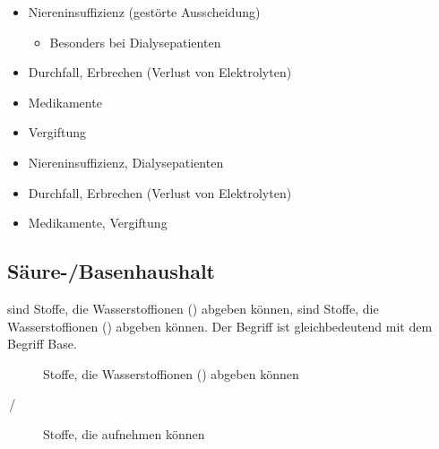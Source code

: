 {%
\label{topic:elektrolytstoerungen}
\label{topic:dialyse-elektrolyte}
%
\begin{itemize}
    \item Niereninsuffizienz (gestörte Ausscheidung)
    \begin{itemize}
        \item Besonders bei Dialysepatienten
    \end{itemize}
    \item Durchfall, Erbrechen (Verlust von Elektrolyten)
    \item Medikamente
    \item Vergiftung
\end{itemize}
}{%
\begin{itemize}
    \item Niereninsuffizienz, Dialysepatienten
    \item Durchfall, Erbrechen (Verlust von Elektrolyten)
    \item Medikamente, Vergiftung
\end{itemize}
}{}{}{}




\subsection{Säure-/Basenhaushalt}
\label{topic:saeure-basen-haushalt}

{%
 sind Stoffe, die 
Wasserstoffionen () abgeben können,  sind 
Stoffe, die Wasserstoffionen () abgeben können. Der Begriff
 ist gleichbedeutend mit dem Begriff Base. 
}{%
\begin{description}
  \item[] Stoffe, die
  Wasserstoffionen () abgeben können
  \item[\,/\,] Stoffe, die  aufnehmen können
\end{description}
}{}{}{}



